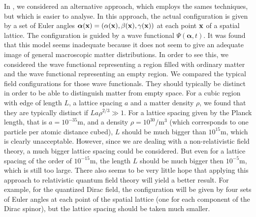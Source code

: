 \documentclass[11pt]{article}
\begin{document}
In \cite{struyve10}, we considered an alternative approach, which employs the sames techniques, but which is easier to analyse. In this approach, the actual configuration is given by a set of Euler angles ${\boldsymbol \alpha}({\bf x}) = (\alpha({\bf x}),\beta({\bf x}),\gamma({\bf x}))$ at each point ${\bf x}$ of a spatial lattice. The configuration is guided by a wave functional $\Psi({\boldsymbol \alpha},t)$. It was found that this model seems inadequate because it does not seem to give an adequate image of general macroscopic matter distributions. In order to see this, we considered the wave functional representing a region filled with ordinary matter and the wave functional representing an empty region. We compared the typical field configurations for those wave functionals. They should typically be distinct in order to be able to distinguish matter from empty space. For a cubic region with edge of length $L$, a lattice spacing $a$ and a matter density $\rho$, we found that they are typically distinct if $L a \rho^{2/3}\gg 1$. For a lattice spacing given by the Planck length, that is $a=10^{-35}$m, and a density $\rho = 10^{30}/$m$^3$ (which corresponds to one particle per atomic distance cubed), $L$ should be much bigger than $10^{15}$m, which is clearly unacceptable. However, since we are dealing with a non-relativistic field theory, a much bigger lattice spacing could be considered. But even for a lattice spacing of the order of $10^{-15}$m, the length $L$ should be much bigger then $10^{-5}$m, which is still too large. There also seems to be very little hope that applying this approach to relativistic quantum field theory will yield a better result. For example, for the quantized Dirac field, the configuration will be given by four sets of Euler angles at each point of the spatial lattice (one for each component of the Dirac spinor), but the lattice spacing should be taken much smaller.
\end{document}
